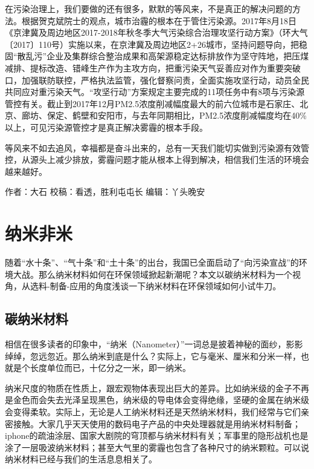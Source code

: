 \documentclass[
]{book}
\begin{document}
在污染治理上，我们要做的还有很多，默默的等风来，不是真正的解决问题的方法。根据贺克斌院士的观点，城市治霾的根本在于管住污染源。2017年8月18日《京津冀及周边地区2017-2018年秋冬季大气污染综合治理攻坚行动方案》（环大气〔2017〕110号）实施以来，在京津冀及周边地区2+26城市，坚持问题导向，把稳固``散乱污''企业及集群综合整治成果和高架源稳定达标排放作为坚守阵地，把压煤减排、提标改造、错峰生产作为主攻方向，把重污染天气妥善应对作为重要突破口，加强联防联控，严格执法监管，强化督察问责，全面实施攻坚行动，动员全民共同应对重污染天气。``攻坚行动''方案规定主要完成的11项任务中有8项与污染源管控有关。截止到2017年12月PM2.5浓度削减幅度最大的前六位城市是石家庄、北京、廊坊、保定、鹤壁和安阳市，与去年同期相比，PM2.5浓度削减幅度均在40\%以上，可见污染源管控才是真正解决雾霾的根本手段。

等风来不如去追风，幸福都是奋斗出来的，总有一天我们能切实做到污染源有效管控，从源头上减少排放，雾霾问题才能从根本上得到解决，相信我们生活的环境会越来越好。

作者：大石
校稿：看透，胜利屯屯长
编辑：丫头晚安

\hypertarget{ux7eb3ux7c73ux975eux7c73}{%
\section{纳米非米}\label{ux7eb3ux7c73ux975eux7c73}}

随着``水十条''、``气十条''和``土十条''的出台，我国已全面启动了``向污染宣战''的环境大战。那么纳米材料如何在环保领域掀起新潮呢？本文以碳纳米材料为一个视角，从选料-制备-应用的角度浅谈一下纳米材料在环保领域如何小试牛刀。

\hypertarget{ux78b3ux7eb3ux7c73ux6750ux6599}{%
\subsection{碳纳米材料}\label{ux78b3ux7eb3ux7c73ux6750ux6599}}

相信在很多读者的印象中，``纳米（Nanometer）''一词总是披着神秘的面纱，影影绰绰，忽远忽近。那么纳米到底是什么？实际上，它与毫米、厘米和分米一样，也就是个长度单位而已，十亿分之一米，即一纳米。

纳米尺度的物质在性质上，跟宏观物体表现出巨大的差异。比如纳米级的金子不再是金色而会失去光泽呈现黑色，纳米级的导电体会变得绝缘，坚硬的金属在纳米级会变得柔软。实际上，无论是人工纳米材料还是天然纳米材料，我们经常与它们亲密接触。大家几乎天天使用的数码电子产品的中央处理器就是用纳米材料制备；iphone的疏油涂层、国家大剧院的穹顶都与纳米材料有关；军事里的隐形战机也是涂了一层吸波纳米材料；甚至大气里的雾霾也包含了各种尺寸的纳米颗粒。可以说纳米材料已经与我们的生活息息相关了。
\end{document}
